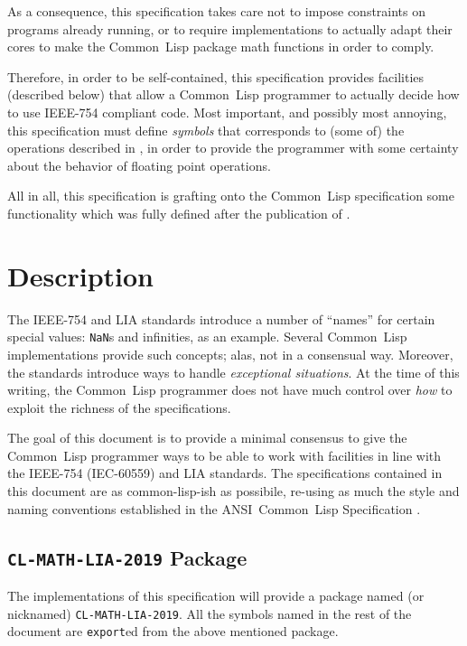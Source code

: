 \documentclass[10pt,fleqn]{article}
\newcommand{\CL}{\textsf{Common~Lisp}}
\newcommand{\code}[1]{\texttt{#1}}
\newcommand{\IEEEFPStd}{IEEE-754}
\newcommand{\IECFPStd}{IEC-60559}
\begin{document}
As a consequence, this specification takes care not to impose
constraints on programs already running, or to require implementations to
actually adapt their cores to make the \CL{} package math functions in
order to comply.

Therefore, in order to be self-contained, this specification provides
facilities (described below) that allow a \CL{} programmer to actually
decide how to use \IEEEFPStd{} compliant code.  Most important, and
possibly most annoying, this specification must define \emph{symbols}
that corresponds to (some of) the operations described in
\cite{2008:IEEE-754}, in order to provide the programmer with some
certainty about the behavior of floating point operations.

All in all, this specification is grafting onto the \CL{}
specification some functionality which was fully defined after the
publication of \cite{1996:ANSIHyperSpec}.



\section{Description}

The \IEEEFPStd{} and LIA standards introduce a number of ``names'' for
certain special values: \code{NaN}s and infinities, as an example.
Several \CL{} implementations provide such concepts; alas, not in a
consensual way.  Moreover, the standards introduce ways to handle
\emph{exceptional situations}. At the time of this writing, the \CL{}
programmer does not have much control over \emph{how} to exploit the
richness of the specifications.

The goal of this document is to provide a minimal
consensus to give the \CL{} programmer ways to be able to work with
facilities in line with the \IEEEFPStd{} (\IECFPStd{}) and LIA
standards.  The specifications contained in this document are as
\textsf{common-lisp}-ish as possibile, re-using as much the style and
naming conventions established in the ANSI~\CL{} Specification
\cite{1994:ANSICL,1996:ANSIHyperSpec}.



\subsection{\code{CL-MATH-LIA-2019} Package}
\label{sect:package}

The implementations of this specification will provide a package named
(or nicknamed) \code{CL-MATH-LIA-2019}.  All the symbols named in the rest
of the document are \code{export}ed from the above mentioned package.
\end{document}
